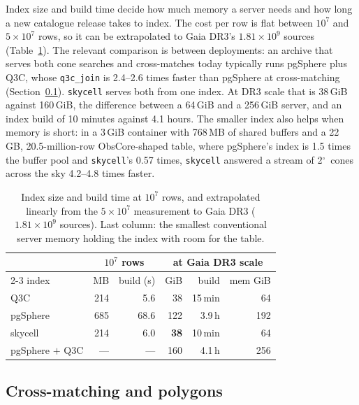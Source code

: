 \documentclass[final,5p,times,twocolumn,authoryear]{elsarticle}
\newcommand{\degr}{\ensuremath{^{\circ}}}
\newcommand{\Sect}{Section}
\begin{document}
Index size and build time decide how much memory a server needs and how long a new
catalogue release takes to index. The cost per row is flat between $10^7$ and $5\times10^7$ rows, so it can be
extrapolated to Gaia DR3's $1.81\times10^9$ sources (Table~\ref{tab:gaia}). The
relevant comparison is between deployments: an archive that serves both cone searches
and cross-matches today typically runs pgSphere plus Q3C, whose \texttt{q3c\_join} is
2.4--2.6 times faster than pgSphere at cross-matching (\Sect~\ref{sec:xmatch}).
\texttt{skycell} serves both from one index. At DR3 scale that is 38\,GiB against
160\,GiB, the difference between a 64\,GiB and a 256\,GiB server, and an index build of
10 minutes against 4.1 hours. The smaller index also helps when memory is short: in a
3\,GiB container with 768\,MB of shared buffers and a 22\,GB, 20.5-million-row
ObsCore-shaped table, where pgSphere's index is 1.5 times the buffer pool and
\texttt{skycell}'s 0.57 times, \texttt{skycell} answered a stream of 2\degr\ cones
across the sky 4.2--4.8 times faster.

\begin{table}
  \caption{Index size and build time at $10^7$ rows, and extrapolated linearly from the
    $5\times10^7$ measurement to Gaia DR3 ($1.81\times10^9$ sources). Last column: the
    smallest conventional server memory holding the index with room for the table.}
  \label{tab:gaia}
  \centering
  \footnotesize
  \begin{tabular}{@{}l rr rrr@{}}
    \hline\hline
    & \multicolumn{2}{c}{$10^7$ rows} & \multicolumn{3}{c}{at Gaia DR3 scale} \\
    \cline{2-3}\cline{4-6}
    index & MB & build (s) & GiB & build & mem GiB \\
    \hline
    Q3C              & 214 &  5.6 & 38 & 15\,min & 64 \\
    pgSphere         & 685 & 68.6 & 122 & 3.9\,h & 192 \\
    skycell          & 214 &  6.0 & \textbf{38} & 10\,min & 64 \\
    \hline
    pgSphere $+$ Q3C & --- & --- & 160 & 4.1\,h & 256 \\
    \hline
  \end{tabular}
\end{table}

\subsection{Cross-matching and polygons}
\label{sec:xmatch}
\label{sec:otherops}
\end{document}
